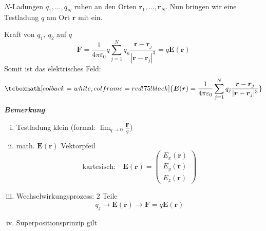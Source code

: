 \documentclass[titlepage,11pt,a4paper,ngerman]{report}
\newcommand{\tx}[1]{\textrm{#1}}
\newcommand{\summ}[2]{\sum_{#1}^{#2}}
\renewcommand{\vec}[1]{\boldsymbol{#1}}
\renewcommand{\epsilon}{\varepsilon}
\newcommand{\rmbox}[1]{\tcboxmath[colback=white,colframe=red!75!black]{#1}}
\begin{document}
\begin{minipage}{.5\linewidth}
	$N$-Ladungen $q_1, \dots, q_N$ ruhen an den Orten $\vec{r}_1, \dots, \vec{r}_N$. Nun bringen wir eine Testladung $q$ am Ort $\vec{r}$ mit ein. 
\end{minipage}
\begin{minipage}{.5\linewidth}
	\hspace{50pt}
\end{minipage}
Kraft von $q_1,\ q_2$ auf $q$
$$\vec{F} = \frac{1}{4\pi \epsilon_0} q \summ{j = 1}{N} q_n \frac{\vec{r} - \vec{r}_j}{|\vec{r} - \vec{r}_j|^3} = q \vec{E}(\vec{r})$$
Somit ist das elektrisches Feld:
$$\rmbox{\vec{E}(\vec{r}) = \frac{1}{4 \pi \epsilon_0} \summ{j = 1}{N} q_j \frac{\vec{r} - \vec{r}_j}{|\vec{r} - \vec{r}_j|^3}}$$
\textbf{\emph{Bemerkung}}
\begin{enumerate}[i)]
	\item Testladung klein (formal: $ \lim_{q\to0}\frac{\vec{F}}{q} $)
	\item math. $ \vec{E}(\vec{r}) $ Vektorpfeil\\
	\begin{equation*}
	\tx{kartesisch:} \quad \vec{E}(\vec{r}) = \begin{pmatrix}
	E_x(\vec{r}) \\ E_y(\vec{r}) \\ E_z(\vec{r})
	\end{pmatrix}
	\end{equation*}
	\item Wechselwirkungsprozess: 2 Teile
	\begin{equation*}
	q_j \rightarrow \vec{E}(\vec{r}) \rightarrow \vec{F} = q \vec{E} (\vec{r})
	\end{equation*}
	\item Superpositionsprinzip gilt
\end{enumerate}
\end{document}
